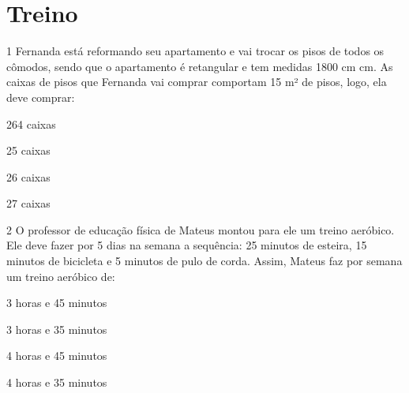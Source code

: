 \section{Treino}

\num{1} Fernanda está reformando seu apartamento e vai trocar os pisos de
todos os cômodos, sendo que o apartamento é retangular e tem medidas
1800 cm  cm. As caixas de pisos que
Fernanda vai comprar comportam 15 m² de pisos, logo, ela deve comprar:

\begin{escolha}
\item 264 caixas
\item 25 caixas
\item 26 caixas
\item 27 caixas
\end{escolha}



\num{2} O professor de educação física de Mateus montou para ele um treino
aeróbico. Ele deve fazer por 5 dias na semana a sequência: 25 minutos de
esteira, 15 minutos de bicicleta e 5 minutos de pulo de corda. Assim,
Mateus faz por semana um treino aeróbico de:

\begin{escolha}
\item 3 horas e 45 minutos
\item 3 horas e 35 minutos
\item 4 horas e 45 minutos
\item 4 horas e 35 minutos
\end{escolha}

